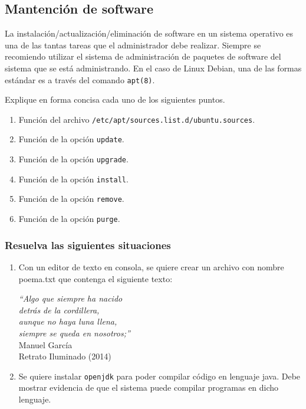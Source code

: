 \documentclass[10pt,letterpaper,twoside,onecolumn]{rho-class/rho}
\begin{document}
    \subsection{Mantención de software}

    La instalación/actualización/eliminación de software en un sistema operativo es una de las tantas tareas que el administrador debe realizar. Siempre se recomiendo utilizar el sistema de administración de paquetes de software del sistema que se está administrando. En el caso de Linux Debian, una de las formas estándar es a través del comando \texttt{apt(8)}. 

    Explique en forma concisa cada uno de los siguientes puntos.
    \begin{enumerate}
        \item Función del archivo \texttt{/etc/apt/sources.list.d/ubuntu.sources}.
        \item Función de la opción \texttt{update}.
        \item Función de la opción \texttt{upgrade}.
        \item Función de la opción \texttt{install}.
        \item Función de la opción \texttt{remove}.
        \item Función de la opción \texttt{purge}.
    \end{enumerate}


    \subsubsection{Resuelva las siguientes situaciones}

    \begin{enumerate}
        \item Con un editor de texto en consola, se quiere crear un archivo con nombre poema.txt que contenga el siguiente texto:
        \begin{enumerate}
            \textit{``Algo que siempre ha nacido\\
                detrás de la cordillera,\\
                aunque no haya luna llena,\\
                siempre se queda en nosotros;''\\}
                Manuel García\\
                Retrato Iluminado (2014)
        \end{enumerate}
        \item Se quiere instalar \texttt{openjdk} para poder compilar código en lenguaje java. Debe mostrar evidencia de que el sistema puede compilar programas en dicho lenguaje.

    \end{enumerate}
\end{document}

